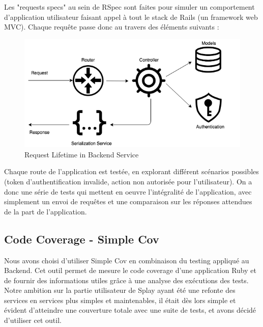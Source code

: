 \documentclass{eplmastersthesis}
\begin{document}
          Les "requests specs" au sein de RSpec sont faites pour simuler un
          comportement d'application utilisateur faisant appel à tout le stack
          de Rails (un framework web MVC).
          Chaque requête passe donc au travers des éléments suivants :\\

          \begin{figure}[H]
            \centering
            \includegraphics[scale=0.6]{figures/request_test.png}
            \caption{\label{request_test} Request Lifetime in Backend Service}
          \end{figure}

          Chaque route de l'application est testée, en explorant différent
          scénarios possibles (token d'authentification invalide, action
          non autorisée pour l'utilisateur). On a donc une série de tests
          qui mettent en oeuvre l'intégralité de l'application, avec simplement
          un envoi de requêtes et une comparaison sur les réponses attendues
          de la part de l'application.

      \subsection{Code Coverage - Simple Cov}

        Nous avons choisi d'utiliser Simple Cov en combinaison du testing appliqué
        au Backend. Cet outil permet de mesure le code coverage d'une application
        Ruby et de fournir des informations utiles grâce à une analyse des
        exécutions des tests.\\

        Notre ambition sur la partie utilisateur de Splay ayant été une refonte
        des services en services plus simples et maintenables, il était dès lors
        simple et évident d'atteindre une couverture totale avec une suite de tests,
        et avons décidé d'utiliser cet outil.
\end{document}
